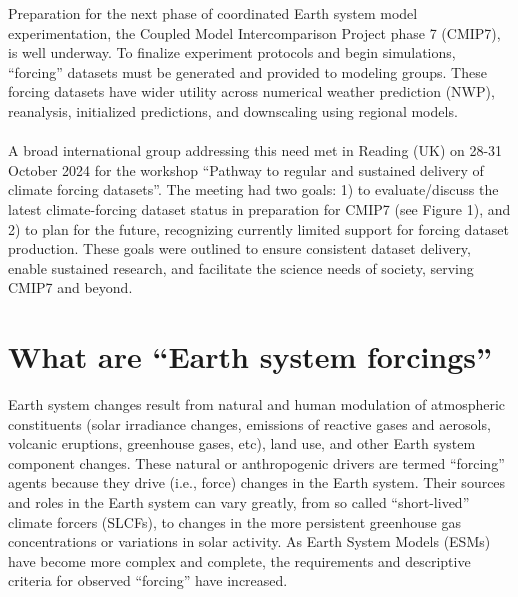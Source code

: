 \documentclass{ametsocV6.1}
\begin{document}

Preparation for the next phase of coordinated Earth system model experimentation, the Coupled Model Intercomparison Project phase 7 (CMIP7), is well underway. To finalize experiment protocols and begin simulations, ``forcing'' datasets must be generated and provided to modeling groups. These forcing datasets have wider utility across numerical weather prediction (NWP), reanalysis, initialized predictions, and downscaling using regional models. \\ 
\\
A broad international group addressing this need met in Reading (UK) on 28-31 October 2024 for the workshop ``Pathway to regular and sustained delivery of climate forcing datasets''. The meeting had two goals: 1) to evaluate/discuss the latest climate-forcing dataset status in preparation for CMIP7 (see Figure 1), and 2) to plan for the future, recognizing currently limited support for forcing dataset production. These goals were outlined to ensure consistent dataset delivery, enable sustained research, and facilitate the science needs of society, serving CMIP7 and beyond.

\section*{What are ``Earth system forcings''}
Earth system changes result from natural and human modulation of atmospheric constituents (solar irradiance changes, emissions of reactive gases and aerosols, volcanic eruptions, greenhouse gases, etc), land use, and other Earth system component changes. These natural or anthropogenic drivers are termed ``forcing'' agents because they drive (i.e., force) changes in the Earth system. Their sources and roles in the Earth system can vary greatly, from so called ``short-lived'' climate forcers (SLCFs), to changes in the more persistent greenhouse gas concentrations or variations in solar activity. As Earth System Models (ESMs) have become more complex and complete, the requirements and descriptive criteria for observed ``forcing'' have increased.
\end{document}

